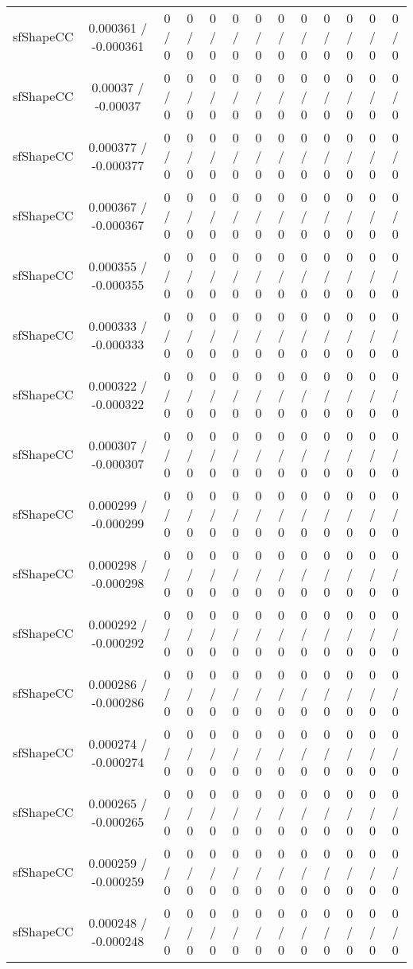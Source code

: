 \documentclass[10pt]{article}
\begin{document}
\begin{table}[htbp]
\begin{center}
\begin{tabular}{|c|c|c|c|c|c|c|c|c|c|c|c|c|}
  sfShapeCC & 0.000361 / -0.000361 & 0 / 0 & 0 / 0 & 0 / 0 & 0 / 0 & 0 / 0 & 0 / 0 & 0 / 0 & 0 / 0 & 0 / 0 & 0 / 0 & 0 / 0 \\ 
  sfShapeCC & 0.00037 / -0.00037 & 0 / 0 & 0 / 0 & 0 / 0 & 0 / 0 & 0 / 0 & 0 / 0 & 0 / 0 & 0 / 0 & 0 / 0 & 0 / 0 & 0 / 0 \\ 
  sfShapeCC & 0.000377 / -0.000377 & 0 / 0 & 0 / 0 & 0 / 0 & 0 / 0 & 0 / 0 & 0 / 0 & 0 / 0 & 0 / 0 & 0 / 0 & 0 / 0 & 0 / 0 \\ 
  sfShapeCC & 0.000367 / -0.000367 & 0 / 0 & 0 / 0 & 0 / 0 & 0 / 0 & 0 / 0 & 0 / 0 & 0 / 0 & 0 / 0 & 0 / 0 & 0 / 0 & 0 / 0 \\ 
  sfShapeCC & 0.000355 / -0.000355 & 0 / 0 & 0 / 0 & 0 / 0 & 0 / 0 & 0 / 0 & 0 / 0 & 0 / 0 & 0 / 0 & 0 / 0 & 0 / 0 & 0 / 0 \\ 
  sfShapeCC & 0.000333 / -0.000333 & 0 / 0 & 0 / 0 & 0 / 0 & 0 / 0 & 0 / 0 & 0 / 0 & 0 / 0 & 0 / 0 & 0 / 0 & 0 / 0 & 0 / 0 \\ 
  sfShapeCC & 0.000322 / -0.000322 & 0 / 0 & 0 / 0 & 0 / 0 & 0 / 0 & 0 / 0 & 0 / 0 & 0 / 0 & 0 / 0 & 0 / 0 & 0 / 0 & 0 / 0 \\ 
  sfShapeCC & 0.000307 / -0.000307 & 0 / 0 & 0 / 0 & 0 / 0 & 0 / 0 & 0 / 0 & 0 / 0 & 0 / 0 & 0 / 0 & 0 / 0 & 0 / 0 & 0 / 0 \\ 
  sfShapeCC & 0.000299 / -0.000299 & 0 / 0 & 0 / 0 & 0 / 0 & 0 / 0 & 0 / 0 & 0 / 0 & 0 / 0 & 0 / 0 & 0 / 0 & 0 / 0 & 0 / 0 \\ 
  sfShapeCC & 0.000298 / -0.000298 & 0 / 0 & 0 / 0 & 0 / 0 & 0 / 0 & 0 / 0 & 0 / 0 & 0 / 0 & 0 / 0 & 0 / 0 & 0 / 0 & 0 / 0 \\ 
  sfShapeCC & 0.000292 / -0.000292 & 0 / 0 & 0 / 0 & 0 / 0 & 0 / 0 & 0 / 0 & 0 / 0 & 0 / 0 & 0 / 0 & 0 / 0 & 0 / 0 & 0 / 0 \\ 
  sfShapeCC & 0.000286 / -0.000286 & 0 / 0 & 0 / 0 & 0 / 0 & 0 / 0 & 0 / 0 & 0 / 0 & 0 / 0 & 0 / 0 & 0 / 0 & 0 / 0 & 0 / 0 \\ 
  sfShapeCC & 0.000274 / -0.000274 & 0 / 0 & 0 / 0 & 0 / 0 & 0 / 0 & 0 / 0 & 0 / 0 & 0 / 0 & 0 / 0 & 0 / 0 & 0 / 0 & 0 / 0 \\ 
  sfShapeCC & 0.000265 / -0.000265 & 0 / 0 & 0 / 0 & 0 / 0 & 0 / 0 & 0 / 0 & 0 / 0 & 0 / 0 & 0 / 0 & 0 / 0 & 0 / 0 & 0 / 0 \\ 
  sfShapeCC & 0.000259 / -0.000259 & 0 / 0 & 0 / 0 & 0 / 0 & 0 / 0 & 0 / 0 & 0 / 0 & 0 / 0 & 0 / 0 & 0 / 0 & 0 / 0 & 0 / 0 \\ 
  sfShapeCC & 0.000248 / -0.000248 & 0 / 0 & 0 / 0 & 0 / 0 & 0 / 0 & 0 / 0 & 0 / 0 & 0 / 0 & 0 / 0 & 0 / 0 & 0 / 0 & 0 / 0 \\ 

\end{tabular}
\end{center}
\end{table}
\end{document}
